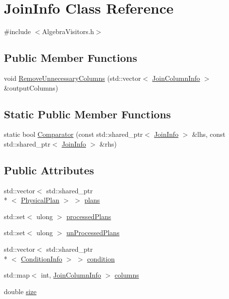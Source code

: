 \hypertarget{class_join_info}{\section{Join\+Info Class Reference}
\label{class_join_info}
}


{\ttfamily \#include $<$Algebra\+Visitors.\+h$>$}

\subsection*{Public Member Functions}
\begin{DoxyCompactItemize}
\item 
void \hyperlink{class_join_info_aa4c03bd8c1d0a7f4a5b89287d69f89b5}{Remove\+Unnecessary\+Columns} (std\+::vector$<$ \hyperlink{class_join_column_info}{Join\+Column\+Info} $>$ \&output\+Columns)
\end{DoxyCompactItemize}
\subsection*{Static Public Member Functions}
\begin{DoxyCompactItemize}
\item 
static bool \hyperlink{class_join_info_ae7be09d7cdeb95ad59d9352ee37de990}{Comparator} (const std\+::shared\+\_\+ptr$<$ \hyperlink{class_join_info}{Join\+Info} $>$ \&lhs, const std\+::shared\+\_\+ptr$<$ \hyperlink{class_join_info}{Join\+Info} $>$ \&rhs)
\end{DoxyCompactItemize}
\subsection*{Public Attributes}
\begin{DoxyCompactItemize}
\item 
std\+::vector$<$ std\+::shared\+\_\+ptr\\*
$<$ \hyperlink{class_physical_plan}{Physical\+Plan} $>$ $>$ \hyperlink{class_join_info_acbddcf9cd01e91396492b94a627bdf69}{plans}
\item 
std\+::set$<$ ulong $>$ \hyperlink{class_join_info_a584f1ea54151c8e0c506911a6595c7cb}{processed\+Plans}
\item 
std\+::set$<$ ulong $>$ \hyperlink{class_join_info_ac6d0b302590c265ce7f3c47db28bad44}{un\+Processed\+Plans}
\item 
std\+::vector$<$ std\+::shared\+\_\+ptr\\*
$<$ \hyperlink{class_condition_info}{Condition\+Info} $>$ $>$ \hyperlink{class_join_info_a0b9f3b02df4e768208f53c549e0b6e61}{condition}
\item 
std\+::map$<$ int, \hyperlink{class_join_column_info}{Join\+Column\+Info} $>$ \hyperlink{class_join_info_a5acbaceb6d2731a73c9540581b4135ae}{columns}
\item 
double \hyperlink{class_join_info_a526146b07ef6d1bba7475f7998bf0588}{size}
\end{DoxyCompactItemize}


